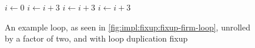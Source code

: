 \begin{figure}[H]
	\begin{algorithmic}
		\State $i \gets 0$
			\State {}
			\State $i \gets i + 3$
			\State {}
			\State $i \gets i + 3$
		\EndWhile
			\State {}
			\State $i \gets i + 3$
		\EndWhile
	\end{algorithmic}
	\caption{An example loop, as seen in \cref{fig:impl:fixup:fixup-firm-loop}, unrolled by a factor of two, and with loop duplication fixup}\label{fig:impl:fixup:loop:fixup-firm-comp}
\end{figure}